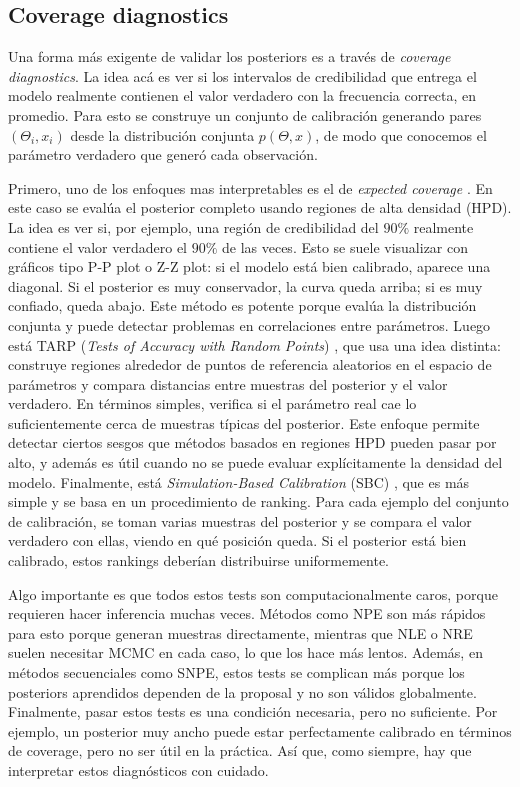 \subsection{Coverage diagnostics}

Una forma más exigente de validar los posteriors es a través de \textit{coverage diagnostics}. La idea acá es ver si los intervalos de credibilidad que entrega el modelo realmente contienen el valor verdadero con la frecuencia correcta, en promedio. Para esto se construye un conjunto de calibración generando pares $(\Theta_i, x_i)$ desde la distribución conjunta $p(\Theta, x)$, de modo que conocemos el parámetro verdadero que generó cada observación.

Primero, uno de los enfoques mas interpretables es el de \textit{expected coverage} \cite{hermans2022}. En este caso se evalúa el posterior completo usando regiones de alta densidad (HPD). La idea es ver si, por ejemplo, una región de credibilidad del $90\%$ realmente contiene el valor verdadero el $90\%$ de las veces. Esto se suele visualizar con gráficos tipo P-P plot o Z-Z plot: si el modelo está bien calibrado, aparece una diagonal. Si el posterior es muy conservador, la curva queda arriba; si es muy confiado, queda abajo. Este método es potente porque evalúa la distribución conjunta y puede detectar problemas en correlaciones entre parámetros. Luego está TARP (\textit{Tests of Accuracy with Random Points}) \cite{lemos2023}, que usa una idea distinta: construye regiones alrededor de puntos de referencia aleatorios en el espacio de parámetros y compara distancias entre muestras del posterior y el valor verdadero. En términos simples, verifica si el parámetro real cae lo suficientemente cerca de muestras típicas del posterior. Este enfoque permite detectar ciertos sesgos que métodos basados en regiones HPD pueden pasar por alto, y además es útil cuando no se puede evaluar explícitamente la densidad del modelo. Finalmente, está \textit{Simulation-Based Calibration} (SBC) \cite{talts2020}, que es más simple y se basa en un procedimiento de ranking. Para cada ejemplo del conjunto de calibración, se toman varias muestras del posterior y se compara el valor verdadero con ellas, viendo en qué posición queda. Si el posterior está bien calibrado, estos rankings deberían distribuirse uniformemente.

Algo importante es que todos estos tests son computacionalmente caros, porque requieren hacer inferencia muchas veces. Métodos como NPE son más rápidos para esto porque generan muestras directamente, mientras que NLE o NRE suelen necesitar MCMC en cada caso, lo que los hace más lentos. Además, en métodos secuenciales como SNPE, estos tests se complican más porque los posteriors aprendidos dependen de la proposal y no son válidos globalmente. Finalmente, pasar estos tests es una condición necesaria, pero no suficiente. Por ejemplo, un posterior muy ancho puede estar perfectamente calibrado en términos de coverage, pero no ser útil en la práctica. Así que, como siempre, hay que interpretar estos diagnósticos con cuidado.